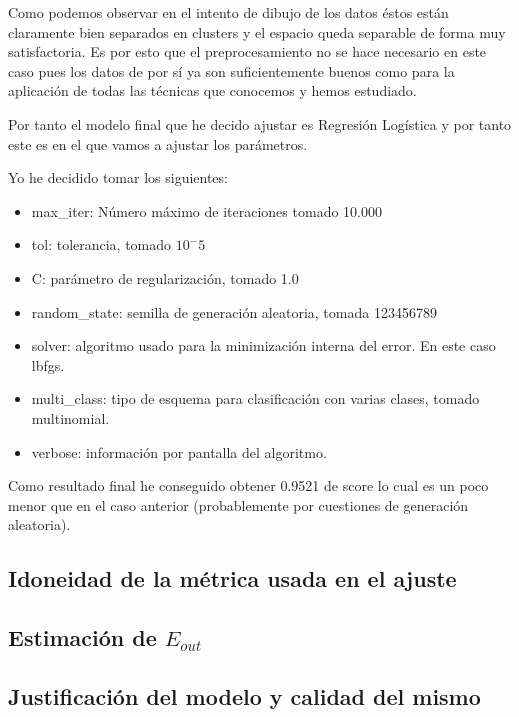 \documentclass[12pt,a4paper]{article}
\begin{document}
Como podemos observar en el intento de dibujo de los datos éstos están claramente bien separados en clusters y el espacio queda separable de forma muy satisfactoria. Es por esto que el preprocesamiento no se hace necesario en este caso pues los datos de por sí ya son suficientemente buenos como para la aplicación de todas las técnicas que conocemos y hemos estudiado.

Por tanto el modelo final que he decido ajustar es Regresión Logística y por tanto este es en el que vamos a ajustar los parámetros.

Yo he decidido tomar los siguientes:

\begin{itemize}
	\item max\_iter: Número máximo de iteraciones tomado 10.000
	\item tol: tolerancia, tomado $10^-5$
	\item C: parámetro de regularización, tomado 1.0
	\item random\_state: semilla de generación aleatoria, tomada 123456789
	\item solver: algoritmo usado para la minimización interna del error. En este caso lbfgs.
	\item multi\_class: tipo de esquema para clasificación con varias clases, tomado multinomial.
	\item verbose: información por pantalla del algoritmo.
\end{itemize}

Como resultado final he conseguido obtener 0.9521 de score lo cual es un poco menor que en el caso anterior (probablemente por cuestiones de generación aleatoria). 

\subsection{Idoneidad de la métrica usada en el ajuste}

\subsection{Estimación de $E_{out}$}

\subsection{Justificación del modelo y calidad del mismo}
\end{document}
